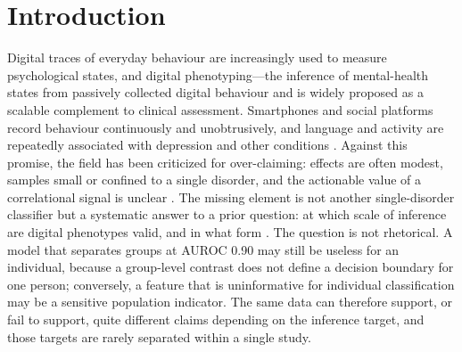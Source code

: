 \documentclass[11pt]{article}
\begin{document}
\section*{Introduction}
Digital traces of everyday behaviour are increasingly used to measure psychological states, and digital phenotyping---the inference of mental-health states from passively collected digital behaviour
\cite{insel2017digital,insel2018global,onnela2016harnessing,torous2017dimensions} and is
widely proposed as a scalable complement to clinical assessment. Smartphones and social
platforms record behaviour continuously and unobtrusively, and language and activity are
repeatedly associated with depression and other conditions
\cite{dechoudhury2013predicting,coppersmith2014quantifying,coppersmith2015adhd,
eichstaedt2018facebook,guntuku2017detecting}. Against this promise, the field has been
criticized for over-claiming: effects are often modest, samples small or confined to a single
disorder, and the actionable value of a correlational signal is unclear
\cite{braund2024hype,orben2019association,panayiotou2023time,adam2025smartphones}. The missing
element is not another single-disorder classifier but a systematic answer to a prior question:
at which scale of inference are digital phenotypes valid, and in what form
\cite{giampetruzzi2026promise,lord2023autism}. The question is not rhetorical. A model that
separates groups at AUROC 0.90 may still be useless for an individual, because a group-level
contrast does not define a decision boundary for one person; conversely, a feature that is
uninformative for individual classification may be a sensitive population indicator. The same
data can therefore support, or fail to support, quite different claims depending on the
inference target, and those targets are rarely separated within a single study.
\end{document}
